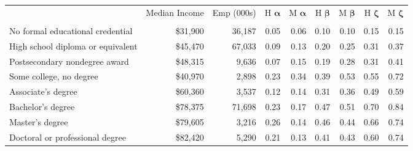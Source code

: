 \scriptsize
\centering
\begin{tabular}{l|rr|rr|rr|rr}
\toprule
{} & Median Income & Emp (000s) &  H $\pmb{\alpha}$ &  M $\pmb{\alpha}$ &  H $\pmb{\beta}$ &  M $\pmb{\beta}$ &  H $\pmb{\zeta}$ &  M $\pmb{\zeta}$ \\
 &      &      &      &      &      &      \\
\midrule
No formal educational credential & \$31,900 & 36,187  & 0.05 & 0.06 & 0.10 & 0.10 & 0.15 & 0.15 \\
High school diploma or equivalent & \$45,470 & 67,033  & 0.09 & 0.13 & 0.20 & 0.25 & 0.31 & 0.37 \\
Postsecondary nondegree award  & \$48,315  & 9,636  & 0.07 & 0.15 & 0.19 & 0.28 & 0.31 & 0.41 \\
Some college, no degree      & \$40,970 & 2,898   & 0.23 & 0.34 & 0.39 & 0.53 & 0.55 & 0.72 \\
Associate's degree          & \$60,360  & 3,537   & 0.12 & 0.14 & 0.31 & 0.36 & 0.49 & 0.59 \\
Bachelor's degree           & \$78,375  & 71,698   & 0.23 & 0.17 & 0.47 & 0.51 & 0.70 & 0.84 \\
Master's degree              & \$79,605  & 3,216  & 0.26 & 0.14 & 0.46 & 0.44 & 0.66 & 0.74 \\
Doctoral or professional degree & \$82,420 & 5,290   & 0.21 & 0.13 & 0.41 & 0.43 & 0.60 & 0.74 \\
\bottomrule
\end{tabular}
